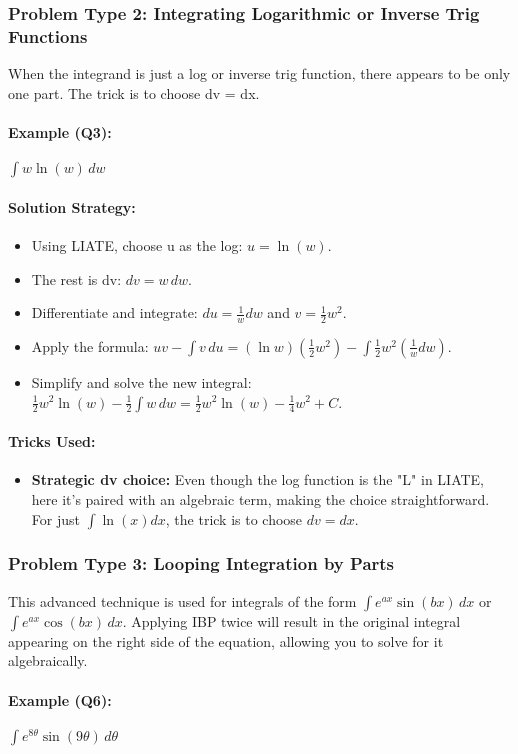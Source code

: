 \documentclass{article}
\begin{document}
\subsubsection{Problem Type 2: Integrating Logarithmic or Inverse Trig Functions}
When the integrand is just a log or inverse trig function, there appears to be only one part. The trick is to choose dv = dx.
\paragraph{Example (Q3):} $ \int w \ln(w) \,dw $
\paragraph{Solution Strategy:}
\begin{itemize}
    \item Using LIATE, choose u as the log: $u = \ln(w)$.
    \item The rest is dv: $dv = w \,dw$.
    \item Differentiate and integrate: $du = \frac{1}{w}dw$ and $v = \frac{1}{2}w^2$.
    \item Apply the formula: $uv - \int v \,du = (\ln w)(\frac{1}{2}w^2) - \int \frac{1}{2}w^2 (\frac{1}{w}dw)$.
    \item Simplify and solve the new integral: $\frac{1}{2}w^2\ln(w) - \frac{1}{2}\int w \,dw = \frac{1}{2}w^2\ln(w) - \frac{1}{4}w^2 + C$.
\end{itemize}
\paragraph{Tricks Used:}
\begin{itemize}
    \item \textbf{Strategic dv choice:} Even though the log function is the "L" in LIATE, here it's paired with an algebraic term, making the choice straightforward. For just $\int \ln(x)dx$, the trick is to choose $dv=dx$.
\end{itemize}

\subsubsection{Problem Type 3: Looping Integration by Parts}
This advanced technique is used for integrals of the form $\int e^{ax}\sin(bx) \,dx$ or $\int e^{ax}\cos(bx) \,dx$. Applying IBP twice will result in the original integral appearing on the right side of the equation, allowing you to solve for it algebraically.
\paragraph{Example (Q6):} $ \int e^{8\theta}\sin(9\theta) \,d\theta $
\end{document}
